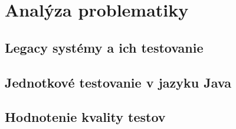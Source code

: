 
\section{Analýza problematiky}\label{sec:analyza}

\subsection{Legacy systémy a ich testovanie}\label{sec:legacy}

\subsection{Jednotkové testovanie v jazyku Java}\label{sec:unittest}

\subsection{Hodnotenie kvality testov}\label{sec:metriky-testov}

